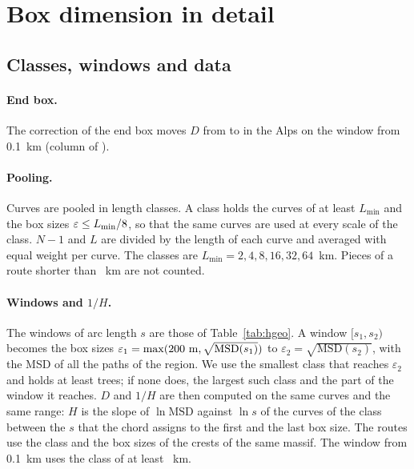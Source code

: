 \section{Box dimension in detail}\label{app:dimension}

\subsection{Classes, windows and data}

\paragraph{End box.} The correction of the end box moves $D$ from \DmCrAlpsFromBoxRaw{} to \DmCrAlpsFromBox{} in the Alps on the window from 0.1~km (column  of ).

\paragraph{Pooling.} Curves are pooled in length classes. A class holds the curves of at least $L_{\min}$ and the box sizes $\varepsilon\le L_{\min}/8$, so that the same curves are used at every scale of the class.
$N-1$ and $L$ are divided by the length of each curve and averaged with equal weight per curve. The classes are $L_{\min}=2,4,8,16,32,64$~km. Pieces of a route shorter than \DmMinPieceKm~km are not counted.

\paragraph{Windows and $1/H$.} The windows of arc length $s$ are those of Table~\ref{tab:hgeo}. A window $[s_1,s_2)$ becomes the box sizes
$\varepsilon_1=\max(200~\mathrm m,\sqrt{\mathrm{MSD}(s_1)})$ to $\varepsilon_2=\sqrt{\mathrm{MSD}(s_2)}$, with the MSD of all the paths of the region. We use the smallest class that reaches $\varepsilon_2$ and holds at least
\DmMinGroups{} trees; if none does, the largest such class and the part of the window it reaches. $D$ and $1/H$ are then computed on the same curves and the same range: $H$ is the slope of $\ln\mathrm{MSD}$ against $\ln s$ of the curves of the class
between the $s$ that the chord assigns to the first and the last box size. The routes use the class and the box sizes of the crests of the same massif. The window from 0.1~km uses the class of at least \DmCrAlpsFromClassKm~km.


